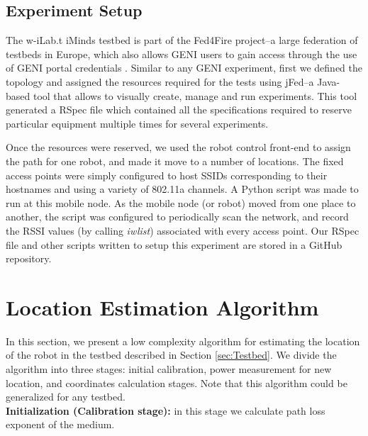 \documentclass[journal]{IEEEtran} 				\IEEEoverridecommandlockouts 						\usepackage{amsmath,amssymb}
\begin{document}
\subsection{Experiment Setup}\label{sec:Testbed:B}

The w-iLab.t iMinds testbed is part of the Fed4Fire project--a large federation of testbeds in Europe, which also allows GENI users to gain access through the use of GENI portal credentials \cite{geni}. Similar to any GENI experiment, first we defined the topology and assigned the resources required for the tests using jFed--a Java-based tool that allows to visually create, manage and run experiments. This tool generated a RSpec file which contained all the specifications required to reserve particular equipment multiple times for several experiments.

Once the resources were reserved, we used the robot control front-end to assign the path for one robot, and made it move to a number of locations. The fixed access points were simply configured to host SSIDs corresponding to their hostnames and using a variety of 802.11a channels. A Python script was made to run at this mobile node. As the mobile node (or robot) moved from one place to another, the script was  configured to periodically scan the network, and record the RSSI values (by calling \textit{iwlist}) associated with every access point. Our RSpec file and other scripts written to setup this experiment are stored in a GitHub repository. 


\section{Location Estimation Algorithm}\label{sec:Algorithm}
In this section, we present a low complexity algorithm for estimating the location of the robot in the testbed described in Section \ref{sec:Testbed}. We divide the algorithm into three stages: initial calibration, power measurement for new location, and coordinates calculation stages. Note that this algorithm could be generalized for any testbed.\\
\textbf{Initialization (Calibration stage):} in this stage we calculate path loss exponent  of the medium.
\end{document}
